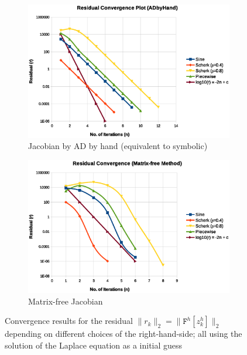 \documentclass[11pt]{scrartcl}
\newcommand{\mSurfDisc}[1]{\ensuremath{\mathtt{F}^h\left[#1\right]}}
\begin{document}
\begin{figure}
	\centering
	\begin{subfigure}{\linewidth}
		\centering
		\includegraphics[width=\linewidth]{figs/ADbyHand}
		\caption{Jacobian by AD by hand (equivalent to symbolic)}
	\end{subfigure}
	\hfill
	\begin{subfigure}{\linewidth}
		\centering
		\includegraphics[width=\linewidth]{figs/Matrixfree}
		\caption{Matrix-free Jacobian}
	\end{subfigure}
	\caption{Convergence results for the residual $\lVert r_k \rVert _2= \lVert \mSurfDisc{z^h_k}\rVert_2$ depending on different choices of the right-hand-side; all using the solution of the Laplace equation as a initial guess}%
\end{figure}
\end{document}
